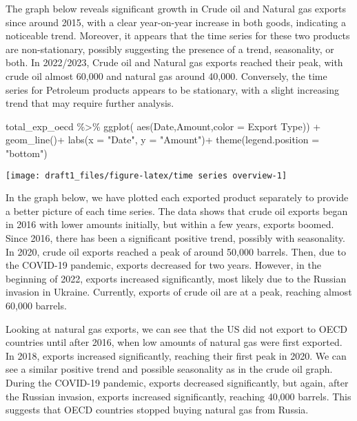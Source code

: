 \documentclass[
]{article}
\newenvironment{Shaded}{\begin{snugshade}}{\end{snugshade}}
\newcommand{\AttributeTok}[1]{\textcolor[rgb]{0.77,0.63,0.00}{#1}}
\newcommand{\FunctionTok}[1]{\textcolor[rgb]{0.00,0.00,0.00}{#1}}
\newcommand{\NormalTok}[1]{#1}
\newcommand{\SpecialCharTok}[1]{\textcolor[rgb]{0.00,0.00,0.00}{#1}}
\newcommand{\StringTok}[1]{\textcolor[rgb]{0.31,0.60,0.02}{#1}}
\begin{document}
The graph below reveals significant growth in Crude oil and Natural gas
exports since around 2015, with a clear year-on-year increase in both
goods, indicating a noticeable trend. Moreover, it appears that the time
series for these two products are non-stationary, possibly suggesting
the presence of a trend, seasonality, or both. In 2022/2023, Crude oil
and Natural gas exports reached their peak, with crude oil almost 60,000
and natural gas around 40,000. Conversely, the time series for Petroleum
products appears to be stationary, with a slight increasing trend that
may require further analysis.

\begin{Shaded}
\begin{Highlighting}[]
\NormalTok{total\_exp\_oecd }\SpecialCharTok{\%\textgreater{}\%} \FunctionTok{ggplot}\NormalTok{(}
 \FunctionTok{aes}\NormalTok{(Date,Amount,}\AttributeTok{color =} \StringTok{\textasciigrave{}}\AttributeTok{Export Type}\StringTok{\textasciigrave{}}\NormalTok{)) }\SpecialCharTok{+}
   \FunctionTok{geom\_line}\NormalTok{()}\SpecialCharTok{+}
   \FunctionTok{labs}\NormalTok{(}\AttributeTok{x =} \StringTok{"Date"}\NormalTok{, }\AttributeTok{y =} \StringTok{"Amount"}\NormalTok{)}\SpecialCharTok{+}
  \FunctionTok{theme}\NormalTok{(}\AttributeTok{legend.position =} \StringTok{"bottom"}\NormalTok{)}
\end{Highlighting}
\end{Shaded}

\begin{center}\texttt{[image: draft1\_files/figure-latex/time series overview-1]} \end{center}

In the graph below, we have plotted each exported product separately to
provide a better picture of each time series. The data shows that crude
oil exports began in 2016 with lower amounts initially, but within a few
years, exports boomed. Since 2016, there has been a significant positive
trend, possibly with seasonality. In 2020, crude oil exports reached a
peak of around 50,000 barrels. Then, due to the COVID-19 pandemic,
exports decreased for two years. However, in the beginning of 2022,
exports increased significantly, most likely due to the Russian invasion
in Ukraine. Currently, exports of crude oil are at a peak, reaching
almost 60,000 barrels.

Looking at natural gas exports, we can see that the US did not export to
OECD countries until after 2016, when low amounts of natural gas were
first exported. In 2018, exports increased significantly, reaching their
first peak in 2020. We can see a similar positive trend and possible
seasonality as in the crude oil graph. During the COVID-19 pandemic,
exports decreased significantly, but again, after the Russian invasion,
exports increased significantly, reaching 40,000 barrels. This suggests
that OECD countries stopped buying natural gas from Russia.
\end{document}
